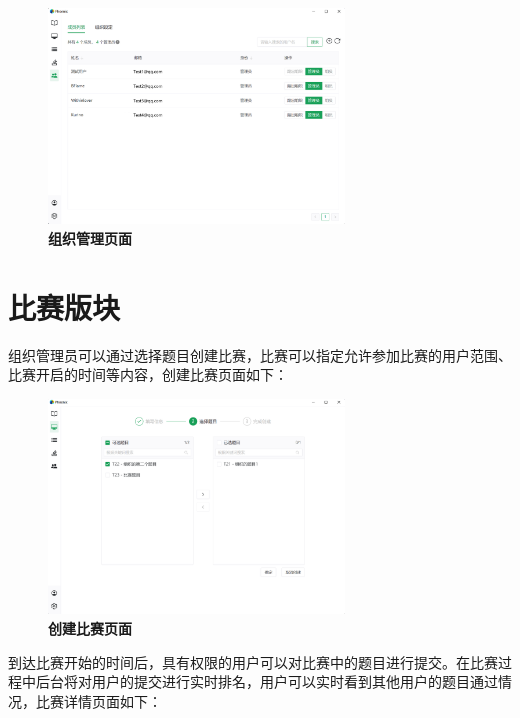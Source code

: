 \begin{figure}[H]
    \centering
    \includegraphics[width=0.7\textwidth]{figure/team2.png}
    \caption{\textbf{组织管理页面}}
    \label{fig:team2}
\end{figure}

\section{比赛版块}

组织管理员可以通过选择题目创建比赛，比赛可以指定允许参加比赛的用户范围、比赛开启的时间等内容，创建比赛页面如下：

\begin{figure}[H]
    \centering
    \includegraphics[width=0.7\textwidth]{figure/contest1.png}
    \caption{\textbf{创建比赛页面}}
    \label{fig:contest1}
\end{figure}

到达比赛开始的时间后，具有权限的用户可以对比赛中的题目进行提交。在比赛过程中后台将对用户的提交进行实时排名，用户可以实时看到其他用户的题目通过情况，比赛详情页面如下：

